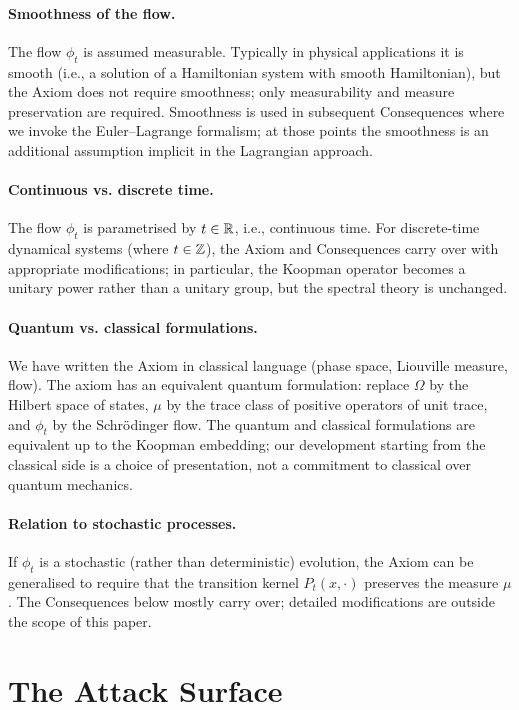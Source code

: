 \paragraph{Smoothness of the flow.} The flow $\phi_{t}$ is assumed measurable. Typically in physical applications it is smooth (i.e., a solution of a Hamiltonian system with smooth Hamiltonian), but the Axiom does not require smoothness; only measurability and measure preservation are required. Smoothness is used in subsequent Consequences where we invoke the Euler--Lagrange formalism; at those points the smoothness is an additional assumption implicit in the Lagrangian approach.

\paragraph{Continuous vs. discrete time.} The flow $\phi_{t}$ is parametrised by $t\in\mathbb{R}$, i.e., continuous time. For discrete-time dynamical systems (where $t\in\mathbb{Z}$), the Axiom and Consequences carry over with appropriate modifications; in particular, the Koopman operator becomes a unitary power rather than a unitary group, but the spectral theory is unchanged.

\paragraph{Quantum vs. classical formulations.} We have written the Axiom in classical language (phase space, Liouville measure, flow). The axiom has an equivalent quantum formulation: replace $\Omega$ by the Hilbert space of states, $\mu$ by the trace class of positive operators of unit trace, and $\phi_{t}$ by the Schr\"odinger flow. The quantum and classical formulations are equivalent up to the Koopman embedding; our development starting from the classical side is a choice of presentation, not a commitment to classical over quantum mechanics.

\paragraph{Relation to stochastic processes.} If $\phi_{t}$ is a stochastic (rather than deterministic) evolution, the Axiom can be generalised to require that the transition kernel $P_{t}(x,\cdot)$ preserves the measure $\mu$. The Consequences below mostly carry over; detailed modifications are outside the scope of this paper.

\section{The Attack Surface}
\label{sec:attack}

